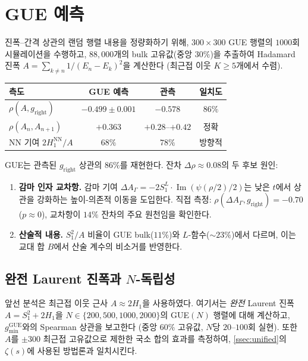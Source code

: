 \documentclass[11pt,a4paper]{article}
\theoremstyle{plain}
\theoremstyle{definition}
\DeclareMathOperator{\GUE}{GUE}
\begin{document}
\section{GUE 예측}
\label{sec:gue}

진폭--간격 상관의 랜덤 행렬 내용을 정량화하기 위해,
$300 \times 300$ GUE 행렬의 $1000$회 시뮬레이션을 수행하고,
$88{,}000$개의 bulk 고유값(중앙 $30\%$)을 추출하여
Hadamard 진폭
$A = \sum_{k \ne n} 1/(E_n - E_k)^2$을 계산한다
(최근접 이웃 $K \ge 5$개에서 수렴).

\begin{center}
\begin{tabular}{lccc}
\toprule
\textbf{측도} & \textbf{GUE 예측} & \textbf{관측} & \textbf{일치도} \\
\midrule
$\rho(A, g_{\mathrm{right}})$ & $-0.499 \pm 0.001$ & $-0.578$ & $86\%$ \\
$\rho(A_n, A_{n+1})$ & $+0.363$ & $+0.28$--$+0.42$ & 정확 \\
NN 기여 $2H_1^{\mathrm{NN}}/A$ & $68\%$ & $78\%$ & 방향적 \\
\bottomrule
\end{tabular}
\end{center}

GUE는 관측된 $g_{\mathrm{right}}$ 상관의 $86\%$를 재현한다.
잔차 $\Delta\rho \approx 0.08$의 두 후보 원인:

\begin{enumerate}
  \item \textbf{감마 인자 교차항.}\;
        감마 기여
        $\Delta A_\Gamma = -2 S_1^L \cdot \operatorname{Im}(\psi(\rho/2)/2)$는
        낮은 $t$에서 상관을 강화하는 높이-의존적 이동을 도입한다.
        직접 측정:
        $\rho(\Delta A_\Gamma, g_{\mathrm{right}}) = -0.70$
        ($p \approx 0$),
        교차항이 $14\%$ 잔차의 주요 원천임을 확인한다.
  \item \textbf{산술적 내용.}\;
        $S_1^2/A$ 비율이 GUE bulk($11\%$)와 $L$-함수(${\sim}23\%$)에서 다르며,
        이는 교대 합 $B$에서 산술 계수의 비소거를 반영한다.
\end{enumerate}

\subsection{완전 Laurent 진폭과 $N$-독립성}
\label{ssec:gue-full}

앞선 분석은 최근접 이웃 근사 $A \approx 2H_1$을 사용하였다.
여기서는 \emph{완전} Laurent 진폭 $A = S_1^2 + 2H_1$을
$N \in \{200,500,1000,2000\}$의 GUE$(N)$ 행렬에 대해 계산하고,
$g_{\min}^{\GUE}$와의 Spearman 상관을 보고한다
(중앙 $60\%$ 고유값, $N$당 $20$--$100$회 실현).
또한 $A$를 $\pm 300$ 최근접 고유값으로 제한한 국소 합의 효과를 측정하여,
\cref{ssec:unified}의 $\zeta(s)$에 사용된 방법론과 일치시킨다.
\end{document}
